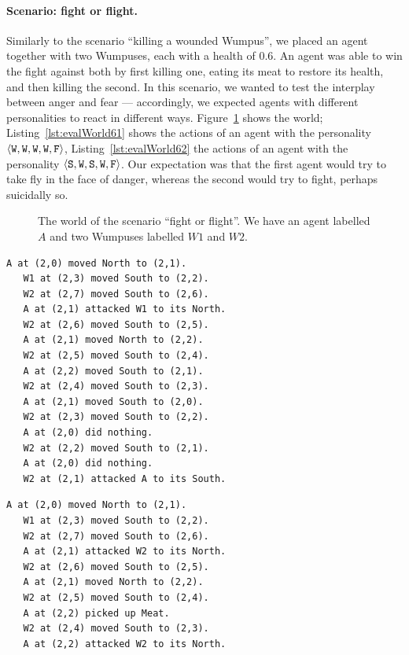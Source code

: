 \paragraph{Scenario: fight or flight.}  Similarly to the scenario ``killing a wounded Wumpus'', we placed an agent together with two Wumpuses, each with a health of 0.6. An agent was able to win the fight against both by first killing one, eating its meat to restore its health, and then killing the second. In this scenario, we wanted to test the interplay between anger and fear --- accordingly, we expected agents with different personalities to react in different ways. Figure~\ref{fig:evalWorld6} shows the world; Listing~\ref{lst:evalWorld61} shows the actions of an agent with the personality $\langle \mathtt{W},\mathtt{W}, \mathtt{W}, \mathtt{W}, \mathtt{F} \rangle$, Listing~\ref{lst:evalWorld62} the actions of an agent with the personality $\langle \mathtt{S},\mathtt{W}, \mathtt{S}, \mathtt{W}, \mathtt{F} \rangle$. Our expectation was that the first agent would try to take fly in the face of danger, whereas the second would try to fight, perhaps suicidally so.

\begin{figure}
    \centering
    
    \caption{The world of the scenario ``fight or flight''. We have an agent labelled $A$ and two Wumpuses labelled $W1$ and $W2$.}
    \label{fig:evalWorld6}
\end{figure}

\begin{lstlisting}[caption=Actions of an agent with the personality $\personality{W}{W}{W}{W}{F}$ in the scenario ``fight or flight''., label=lst:evalWorld61]
   A at (2,0) moved North to (2,1).
   W1 at (2,3) moved South to (2,2).
   W2 at (2,7) moved South to (2,6).
   A at (2,1) attacked W1 to its North.
   W2 at (2,6) moved South to (2,5).
   A at (2,1) moved North to (2,2).
   W2 at (2,5) moved South to (2,4).
   A at (2,2) moved South to (2,1).
   W2 at (2,4) moved South to (2,3).
   A at (2,1) moved South to (2,0).
   W2 at (2,3) moved South to (2,2).
   A at (2,0) did nothing.
   W2 at (2,2) moved South to (2,1).
   A at (2,0) did nothing.
   W2 at (2,1) attacked A to its South.
\end{lstlisting}

\begin{lstlisting}[caption=Actions of an agent with the personality $\personality{S}{W}{S}{W}{F}$ in the scenario ``fight or flight''., label=lst:evalWorld62]
   A at (2,0) moved North to (2,1).
   W1 at (2,3) moved South to (2,2).
   W2 at (2,7) moved South to (2,6).
   A at (2,1) attacked W2 to its North.
   W2 at (2,6) moved South to (2,5).
   A at (2,1) moved North to (2,2).
   W2 at (2,5) moved South to (2,4).
   A at (2,2) picked up Meat.
   W2 at (2,4) moved South to (2,3).
   A at (2,2) attacked W2 to its North.
\end{lstlisting}


